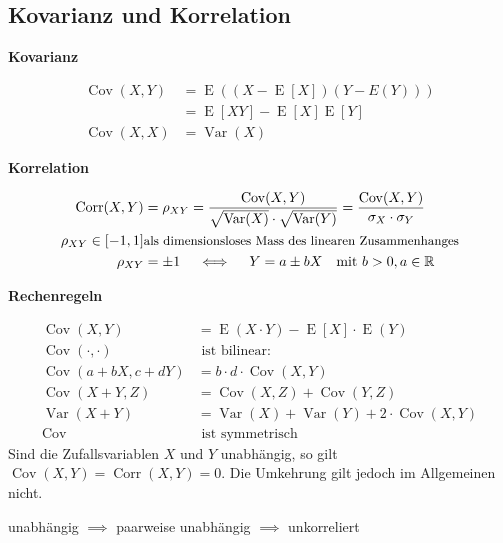 \documentclass[25pt]{sciposter}
\newcommand{\R}{\mathbb{R}}
\newcommand{\Var}{\operatorname{Var}}
\newcommand{\E}{\operatorname{E}}
\newenvironment{method}[1]{\begin{mdframed}[backgroundcolor=blue!10,innertopmargin=15pt, innerbottommargin=15pt,nobreak=true]
		\textbf{#1 }
	}
	{ 
	\end{mdframed}
}
\newenvironment{thm}[1]{\begin{mdframed}[backgroundcolor=pink!20,innertopmargin=15pt, innerbottommargin=15pt, nobreak=true]
		\textbf{#1 }
	}
	{ 
	\end{mdframed}
}
\begin{document}
\begin{multicols}{3}
		
		\subsection*{Kovarianz und Korrelation}
		
		
		\begin{method}{Kovarianz}
			\begin{align*}	
				\operatorname{Cov}(X,Y) &= \E\left(\left(X-\E[X]\right)\left(Y-E(Y)\right)\right) \\ &= \E[XY]  - \E[X]\E[Y]\\
				\operatorname{Cov}(X,X) &= \Var(X)
			\end{align*}
		\end{method}
		
		\begin{method}{Korrelation}
			\begin{align*}
				\operatorname{Corr}(X,Y) &= \rho_{XY} = \frac{\operatorname{Cov}(X,Y)}{\sqrt{\Var(X)} \cdot \sqrt{\Var(Y)}}
				= \frac{\operatorname{Cov}(X,Y)}{\sigma_X\cdot\sigma_Y} \\
				\rho_{XY} \in [-1,1] &  \text{\small als dimensionsloses Mass des linearen Zusammenhanges} \\
				\rho_{XY} &=\pm 1 \quad \iff \quad Y = a\pm bX \quad \text{mit }b>0, a \in \R
			\end{align*}
		\end{method}
		
		\begin{thm}{Rechenregeln}
			\begin{align*}
				\operatorname{Cov}(X,Y) &= \E(X\cdot Y) - \E[X] \cdot \E(Y) \\
				\operatorname{Cov}(\cdot,\cdot) &\text{ ist bilinear:} \quad \\
				\operatorname{Cov}(a+bX,c+dY) &= b\cdot d \cdot \operatorname{Cov} (X,Y) \\
				\operatorname{Cov}(X+Y,Z) &= \operatorname{Cov}(X,Z)+\operatorname{Cov}(Y,Z) \\
				\Var(X+Y) &= \Var(X)+\Var(Y)+2 \cdot \operatorname{Cov}(X,Y) \\
				\operatorname{Cov} &\text{ ist symmetrisch}
			\end{align*}
			Sind die Zufallsvariablen $X$ und $Y$ unabhängig, so gilt $\operatorname{Cov}(X,Y) = \operatorname{Corr}(X,Y) = 0$.
			Die Umkehrung gilt jedoch im Allgemeinen nicht.
		\end{thm}
		
		
		
		\begin{mdframed}
			\centering
			{unabhängig $\implies$ paarweise unabhängig $\implies$ unkorreliert}
		\end{mdframed}
		

\end{multicols}
\end{document}
